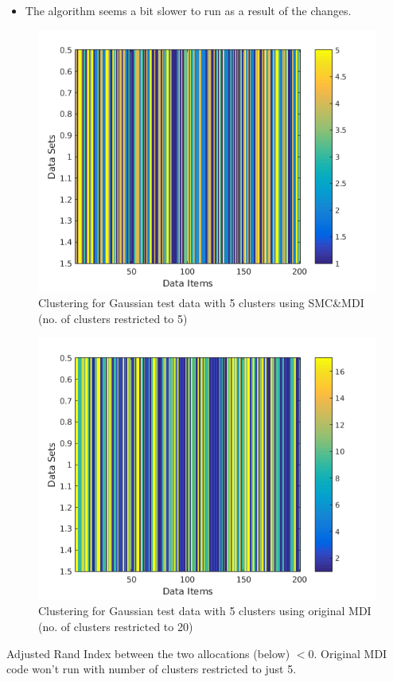 \documentclass[10pt,a4paper]{report}
\begin{document}
\begin{itemize}
\begin{itemize}
\end{itemize}
\item The algorithm seems a bit slower to run as a result of the changes.
\end{itemize}

\begin{figure}
\includegraphics[width = \linewidth]{plots/cluster_smcmdi.png}
\caption{Clustering for Gaussian test data with 5 clusters using SMC\&MDI (no. of clusters restricted to 5)}
\end{figure}

\begin{figure}
\includegraphics[width = \linewidth]{plots/cluster_mdi.png}
\caption{Clustering for Gaussian test data with 5 clusters using original MDI (no. of clusters restricted to 20)}
\end{figure}
Adjusted Rand Index between the two allocations (below) $<0$. Original MDI code won't run with number of clusters restricted to just 5.
\end{document}
